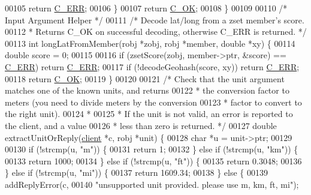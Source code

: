 \begin{DoxyCode}
{00105         \textcolor{keywordflow}{return} \hyperlink{server_8h_af98ac28d5f4d23d7ed5985188e6fb7d1}{C\_ERR};
00106     \}
00107     \textcolor{keywordflow}{return} \hyperlink{server_8h_a303769ef1065076e68731584e758d3e1}{C\_OK};
00108 \}
00109 
00110 \textcolor{comment}{/* Input Argument Helper */}
00111 \textcolor{comment}{/* Decode lat/long from a zset member's score.}
00112 \textcolor{comment}{ * Returns C\_OK on successful decoding, otherwise C\_ERR is returned. */}
00113 \textcolor{keywordtype}{int} longLatFromMember(robj *zobj, robj *member, \textcolor{keywordtype}{double} *xy) \{
00114     \textcolor{keywordtype}{double} score = 0;
00115 
00116     \textcolor{keywordflow}{if} (zsetScore(zobj, member->ptr, &score) == \hyperlink{server_8h_af98ac28d5f4d23d7ed5985188e6fb7d1}{C\_ERR}) \textcolor{keywordflow}{return} \hyperlink{server_8h_af98ac28d5f4d23d7ed5985188e6fb7d1}{C\_ERR};
00117     \textcolor{keywordflow}{if} (!decodeGeohash(score, xy)) \textcolor{keywordflow}{return} \hyperlink{server_8h_af98ac28d5f4d23d7ed5985188e6fb7d1}{C\_ERR};
00118     \textcolor{keywordflow}{return} \hyperlink{server_8h_a303769ef1065076e68731584e758d3e1}{C\_OK};
00119 \}
00120 
00121 \textcolor{comment}{/* Check that the unit argument matches one of the known units, and returns}
00122 \textcolor{comment}{ * the conversion factor to meters (you need to divide meters by the conversion}
00123 \textcolor{comment}{ * factor to convert to the right unit).}
00124 \textcolor{comment}{ *}
00125 \textcolor{comment}{ * If the unit is not valid, an error is reported to the client, and a value}
00126 \textcolor{comment}{ * less than zero is returned. */}
00127 \textcolor{keywordtype}{double} extractUnitOrReply(\hyperlink{structclient}{client} *c, robj *unit) \{
00128     \textcolor{keywordtype}{char} *u = unit->ptr;
00129 
00130     \textcolor{keywordflow}{if} (!strcmp(u, \textcolor{stringliteral}{"m"})) \{
00131         \textcolor{keywordflow}{return} 1;
00132     \} \textcolor{keywordflow}{else} \textcolor{keywordflow}{if} (!strcmp(u, \textcolor{stringliteral}{"km"})) \{
00133         \textcolor{keywordflow}{return} 1000;
00134     \} \textcolor{keywordflow}{else} \textcolor{keywordflow}{if} (!strcmp(u, \textcolor{stringliteral}{"ft"})) \{
00135         \textcolor{keywordflow}{return} 0.3048;
00136     \} \textcolor{keywordflow}{else} \textcolor{keywordflow}{if} (!strcmp(u, \textcolor{stringliteral}{"mi"})) \{
00137         \textcolor{keywordflow}{return} 1609.34;
00138     \} \textcolor{keywordflow}{else} \{
00139         addReplyError(c,
00140             \textcolor{stringliteral}{"unsupported unit provided. please use m, km, ft, mi"});
}
\end{DoxyCode}
